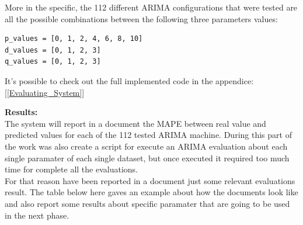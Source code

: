 More in the specific, the 112 different ARIMA configurations that were tested are all the possible combinations between the following three parameters values:
\begin{lstlisting}
p_values = [0, 1, 2, 4, 6, 8, 10]
d_values = [0, 1, 2, 3]
q_values = [0, 1, 2, 3]
\end{lstlisting}

It's possible to check out the full implemented code in the appendice: [\ref{Evaluating_System}]

\newpage

\textbf{Results:}\\
The system will report in a document the MAPE between real value and predicted values for each of the 112 tested ARIMA machine.
During this part of the work was also create a script for execute an ARIMA evaluation about each single paramater of each single dataset, but once executed it required too much time for complete all the evaluations. \\
For that reason have been reported in a document just some relevant evaluations result. The table below here gaves an example about how the documents look like and also report some results about specific paramater that are going to be used in the next phase.

 \begin{table}[ht]
         \caption{MAPE Results for some particular dataset about the parameter "feedConsumption"}   
   \label{table: MAPE_Results_feedConsumption} 
\end{table}     

\newpage

